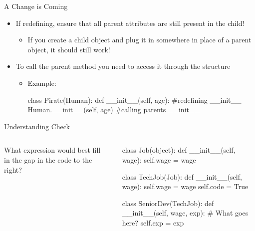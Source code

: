 \documentclass[pdf, aspectratio=169, 12pt]{beamer}
\begin{document}
\begin{frame}[fragile]{A Change is Coming}
	\begin{itemize}
		\item If redefining, ensure that all parent attributes are still present in the child!
			\begin{itemize}
				\item If you create a child object and plug it in somewhere in place of a parent object, it should still work!
			\end{itemize}
		\item To call the parent  method you need to access it through the  structure
			\begin{itemize}
				\item Example:
					\begin{pythoncode}
						class Pirate(Human):
							def __init__(self, age): #redefining __init__
								Human.__init__(self, age)	 #calling parents __init__
					\end{pythoncode}
			\end{itemize}
	\end{itemize}
\end{frame}

\begin{frame}[fragile]{Understanding Check}
	\begin{columns}
		What expression would best fill in the gap in the code to the right?

		\small
		\begin{poll}
		\item {}
		\item {}
		\item {}
		\item {}
		\end{poll}
		
		\footnotesize
		\begin{pythoncode}
			class Job(object):
				def __init__(self, wage):
					self.wage = wage

			class TechJob(Job):
				def __init__(self, wage):
					self.wage = wage
					self.code = True

			class SeniorDev(TechJob):
				def __init__(self, wage, exp):
					# What goes here?
					self.exp = exp
		\end{pythoncode}
	\end{columns}
\end{frame}
\end{document}
